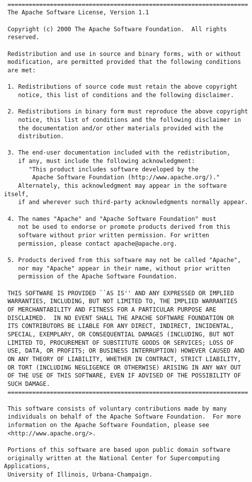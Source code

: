 \begin{lstlisting}[caption=licenza Apache 1.1]

 ====================================================================
 The Apache Software License, Version 1.1

 Copyright (c) 2000 The Apache Software Foundation.  All rights
 reserved.

 Redistribution and use in source and binary forms, with or without
 modification, are permitted provided that the following conditions
 are met:

 1. Redistributions of source code must retain the above copyright
    notice, this list of conditions and the following disclaimer.

 2. Redistributions in binary form must reproduce the above copyright
    notice, this list of conditions and the following disclaimer in
    the documentation and/or other materials provided with the
    distribution.

 3. The end-user documentation included with the redistribution,
    if any, must include the following acknowledgment:
       "This product includes software developed by the
        Apache Software Foundation (http://www.apache.org/)."
    Alternately, this acknowledgment may appear in the software itself,
    if and wherever such third-party acknowledgments normally appear.

 4. The names "Apache" and "Apache Software Foundation" must
    not be used to endorse or promote products derived from this
    software without prior written permission. For written
    permission, please contact apache@apache.org.

 5. Products derived from this software may not be called "Apache",
    nor may "Apache" appear in their name, without prior written
    permission of the Apache Software Foundation.

 THIS SOFTWARE IS PROVIDED ``AS IS'' AND ANY EXPRESSED OR IMPLIED
 WARRANTIES, INCLUDING, BUT NOT LIMITED TO, THE IMPLIED WARRANTIES
 OF MERCHANTABILITY AND FITNESS FOR A PARTICULAR PURPOSE ARE
 DISCLAIMED.  IN NO EVENT SHALL THE APACHE SOFTWARE FOUNDATION OR
 ITS CONTRIBUTORS BE LIABLE FOR ANY DIRECT, INDIRECT, INCIDENTAL,
 SPECIAL, EXEMPLARY, OR CONSEQUENTIAL DAMAGES (INCLUDING, BUT NOT
 LIMITED TO, PROCUREMENT OF SUBSTITUTE GOODS OR SERVICES; LOSS OF
 USE, DATA, OR PROFITS; OR BUSINESS INTERRUPTION) HOWEVER CAUSED AND
 ON ANY THEORY OF LIABILITY, WHETHER IN CONTRACT, STRICT LIABILITY,
 OR TORT (INCLUDING NEGLIGENCE OR OTHERWISE) ARISING IN ANY WAY OUT
 OF THE USE OF THIS SOFTWARE, EVEN IF ADVISED OF THE POSSIBILITY OF
 SUCH DAMAGE.
 ====================================================================

 This software consists of voluntary contributions made by many
 individuals on behalf of the Apache Software Foundation.  For more
 information on the Apache Software Foundation, please see
 <http://www.apache.org/>.

 Portions of this software are based upon public domain software
 originally written at the National Center for Supercomputing Applications,
 University of Illinois, Urbana-Champaign.

\end{lstlisting}


